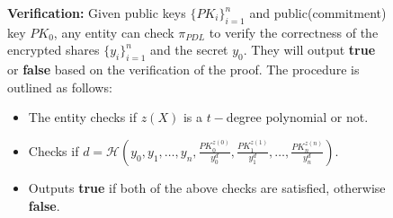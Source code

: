 \begin{figure}[ht]
{\begin{tcolorbox}[title=\textbf{$\Lambda_{RO}$ \cite{cryptoeprint:2025/576}}, width=1.2\textwidth, colframe=blue!75!black, colback=blue!10, sharp corners]
        \vspace{0.5em}
        \textbf{Verification:}
            Given public keys $\{PK_i\}_{i=1}^n$ and public(commitment) key $PK_0$, any entity can check 
            $\pi_{PDL}$ to verify the correctness of the encrypted shares $\{y_i\}_{i=1}^n$ and the secret $y_0$. 
            They will output \textbf{true} or \textbf{false} based on the verification of the proof. The 
            procedure is outlined as follows:
        \begin{itemize}
            \item The entity checks if $z(X)$ is a $t-$degree polynomial or not.
            \item Checks if $d=\mathcal{H}(y_0,y_1,\dots,y_n,\frac{PK_0^{z(0)}}{y_0^d},\frac{PK_1^{z(1)}}{y_1^d},\dots,\frac{PK_n^{z(n)}}{y_n^d})$.
            \item Outputs \textbf{true} if both of the above checks are satisfied, otherwise \textbf{false}.
        \end{itemize}


\end{tcolorbox}}
\end{figure}
